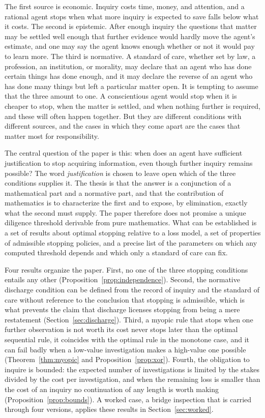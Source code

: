 \documentclass[11pt]{article}
\theoremstyle{plain}
\theoremstyle{definition}
\begin{document}
The first source is economic. Inquiry costs time, money, and attention, and a rational agent stops when what more inquiry is expected to save falls below what it costs. The second is epistemic. After enough inquiry the questions that matter may be settled well enough that further evidence would hardly move the agent's estimate, and one may say the agent knows enough whether or not it would pay to learn more. The third is normative. A standard of care, whether set by law, a profession, an institution, or morality, may declare that an agent who has done certain things has done enough, and it may declare the reverse of an agent who has done many things but left a particular matter open. It is tempting to assume that the three amount to one. A conscientious agent would stop when it is cheaper to stop, when the matter is settled, and when nothing further is required, and these will often happen together. But they are different conditions with different sources, and the cases in which they come apart are the cases that matter most for responsibility.

The central question of the paper is this: when does an agent have sufficient justification to stop acquiring information, even though further inquiry remains possible? The word \emph{justification} is chosen to leave open which of the three conditions supplies it. The thesis is that the answer is a conjunction of a mathematical part and a normative part, and that the contribution of mathematics is to characterize the first and to expose, by elimination, exactly what the second must supply. The paper therefore does not promise a unique diligence threshold derivable from pure mathematics. What can be established is a set of results about optimal stopping relative to a loss model, a set of properties of admissible stopping policies, and a precise list of the parameters on which any computed threshold depends and which only a standard of care can fix.

Four results organize the paper. First, no one of the three stopping conditions entails any other (Proposition~\ref{prop:independence}). Second, the normative discharge condition can be defined from the record of inquiry and the standard of care without reference to the conclusion that stopping is admissible, which is what prevents the claim that discharge licenses stopping from being a mere restatement (Section~\ref{sec:discharge}). Third, a myopic rule that stops when one further observation is not worth its cost never stops later than the optimal sequential rule, it coincides with the optimal rule in the monotone case, and it can fail badly when a low-value investigation makes a high-value one possible (Theorem~\ref{thm:myopic} and Proposition~\ref{prop:xor}). Fourth, the obligation to inquire is bounded: the expected number of investigations is limited by the stakes divided by the cost per investigation, and when the remaining loss is smaller than the cost of an inquiry no continuation of any length is worth making (Proposition~\ref{prop:bounds}). A worked case, a bridge inspection that is carried through four versions, applies these results in Section~\ref{sec:worked}.
\end{document}
